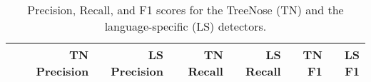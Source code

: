 
\vspace*{-1em}

\begin{table*}[t]
    \centering
    \caption{
        \label{tab:annotation_table}
        Precision, Recall, and F1 scores for the TreeNose (TN) and the language-specific (LS) detectors.
    }
    \renewcommand{\arraystretch}{1.2}
    \begin{tabular}{@{}lrrrrrr@{}}
        \toprule
            {\bf }
            &
            {\bf TN Precision}
            &
            {\bf LS Precision}
            &
            {\bf TN Recall}
            &
            {\bf LS Recall}
            &
            {\bf TN F1}
            &
            {\bf LS F1}
            \\
        \bottomrule
        

    \end{tabular}
    \vspace{-1em}
\end{table*}
